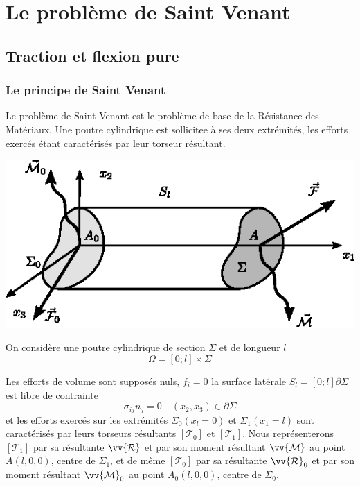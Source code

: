 \chapter{Le problème de Saint Venant}
\section{Traction et flexion pure}
\subsection{Le principe de Saint Venant}
Le problème de Saint Venant est le problème de base de la Résistance des Matériaux.
Une poutre cylindrique est sollicitee à ses deux extrémités, les efforts exercés étant caractérisés par leur torseur résultant.
\begin{multicols}{2}
    \begin{center}
        \includegraphics{../images/T1_Ch07-01}
    \end{center}
    \columnbreak
    On considère une poutre cylindrique de section $\Sigma$ et de longueur $l$
    \begin{equation*}
        \Omega = \left[ 0;l \right] \times \Sigma
    \end{equation*}
\end{multicols}
Les efforts de volume sont supposés nuls, $f_i= 0$ la surface latérale  $S_l= \left[ 0;l \right]\partial \Sigma$ est libre de contrainte
\begin{equation}
    \sigma_{ij} n_j = 0 \quad \left( x_2, x_3 \right) \in \partial \Sigma
    \label{eq:Ch07-001}
\end{equation}
et les efforts exercés sur les extrémités $\Sigma_0 \left( x_l =0 \right)$ et $\Sigma_1 \left( x_1 =l \right)$ sont caractérisés par leurs torseurs résultants $\left[ \mathcal{T}_0 \right]$ et $\left[ \mathcal{T}_1 \right]$.
Nous représenterons $\left[ \mathcal{T}_1 \right]$ par sa résultante $\vv{\mathcal{R}}$ et par son moment résultant $\vv{\mathcal{M}}$ au point $A\left( l,0,0 \right)$, centre de $\Sigma_1$, et de même $\left[ \mathcal{T}_0 \right]$ par sa résultante $\vv{\mathcal{R}}_0$ et par son moment résultant $\vv{\mathcal{M}}_0$ au point $A_0\left( l,0,0 \right)$, centre de $\Sigma_0$.
